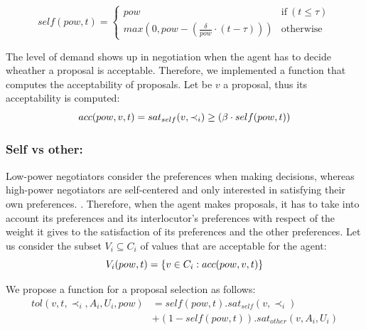 \documentclass[runningheads,a4paper]{llncs}
\begin{document}
	\begin{equation}
	self(pow, t) = \left\{\begin{array}{ll}
	pow & \mathrm{if\ } (t \leq \tau)\\
	max(0, pow - (\frac{\delta}{pow} \cdot (t - \tau))) & \mathrm{otherwise}
	\end{array}\right.
	\end{equation}
	
	The level of demand shows up in negotiation when the agent has to decide wheather a proposal is acceptable.
	Therefore, we implemented a function that computes the acceptability of proposals. Let be $v$ a proposal, thus its acceptability is computed:
	\vspace{-0.5em} 
	\begin{equation}
	\vspace{-.5em} 
	acc(pow,v, t) = sat_{self}(v, \prec_i) \geq  (\beta \cdot self(pow,t))
	\end{equation}
	
	
	\subsubsection{Self vs other:} Low-power negotiators consider the preferences when making decisions, whereas high-power negotiators are self-centered and only interested in satisfying their own preferences. \cite{fiske1993controlling,de1995impact}.
	Therefore, when the agent makes proposals, it has to take into account its preferences and its interlocutor's preferences with respect of the weight it gives to the satisfaction of its preferences and the other preferences.	
	Let us consider the subset $V_i\subseteq C_i$ of values that are acceptable for the agent:
	\vspace{-0.5em} 
	\begin{equation}
	V_i(pow,t) = \{ v\in C_i : acc(pow,v,t) \}
	\vspace{-0.5em}
	\end{equation}
	
	We propose a function for a proposal selection as follows:
	\begin{equation}
	\begin{split}
	tol(v, t, \prec_i, A_i, U_i, pow) & = self(pow, t) . sat_{self}(v, \prec_i) \\
	& +  (1 - self(pow, t)) . sat_{other}(v, A_i, U_i)
	\end{split}
	\end{equation}
	
\end{document}
